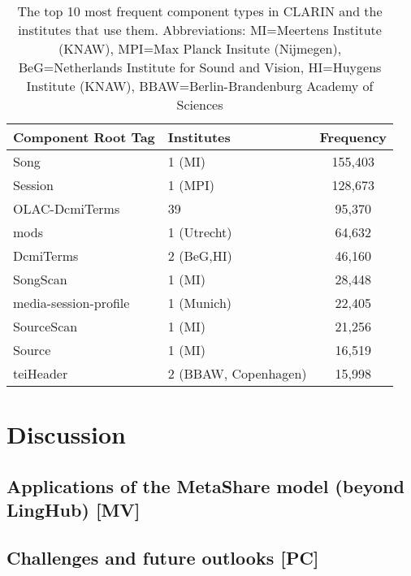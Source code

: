\documentclass{llncs}
\begin{document}
\begin{table}
    \begin{center}
    \begin{tabular}{l|lc}
        Component Root Tag & Institutes & Frequency \\
        \hline
        Song               & 1 (MI)     & 155,403   \\
        Session            & 1 (MPI)    & 128,673   \\
        OLAC-DcmiTerms     & 39         &  95,370   \\
        mods               & 1 (Utrecht)&  64,632   \\
        DcmiTerms          & 2 (BeG,HI) &  46,160   \\
        SongScan           & 1 (MI)     &  28,448   \\
        media-session-profile  & 1 (Munich) &  22,405   \\
        SourceScan         & 1 (MI)     &  21,256   \\
        Source             & 1 (MI)     &  16,519   \\
        teiHeader          & 2 (BBAW, Copenhagen) &  15,998   \\
    \end{tabular}
    \end{center}
    \caption{\label{tab:clarin-types}The top 10 most frequent component types in
    CLARIN and the institutes that use them. Abbreviations: MI=Meertens Institute (KNAW), 
    MPI=Max Planck Insitute (Nijmegen), BeG=Netherlands Institute for Sound and Vision,
HI=Huygens Institute (KNAW), BBAW=Berlin-Brandenburg Academy of Sciences}
\end{table}

\section{Discussion}
\label{sec:discussion}

\subsection{Applications of the MetaShare model (beyond LingHub) [MV]}
\label{sec:applications}

\subsection{Challenges and future outlooks [PC]}
\label{sec:challenges}
\end{document}
